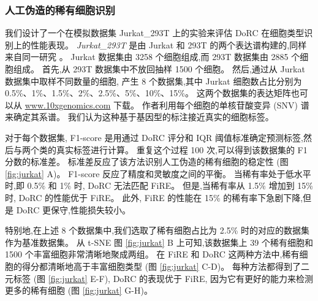 \subsubsection{人工伪造的稀有细胞识别}
\label{subsec:recplanted} 


我们设计了一个在模拟数据集 Jurkat\_293T 上的实验来评估 DoRC 在细胞类型识别上的性能表现。
 \textit{Jurkat\_293T} 是由 Jurkat 和 293T 的两个表达谱构建的,同样来自同一研究 。
Jurkat 数据集由 3258 个细胞组成,而 293T 数据集由 2885 个细胞组成。
首先,从 293T 数据集中不放回抽样 1500 个细胞。
然后,通过从 Jurkat 数据集中取样不同数量的细胞,
产生 8 个数据集,其中 Jurkat 细胞数占比分别为 0.5\%、1\%、1.5\%、2\%、2.5\%、5\%、10\%、15\%。
这两个数据集的表达矩阵也可以从 \url{www.10xgenomics.com} 下载。
作者利用每个细胞的单核苷酸变异 (SNV) 谱来确定其系谱。
我们认为这种基于基因型的标注接近真实的细胞标签。

对于每个数据集, F1-score 是用通过 DoRC 评分和 IQR 阈值标准确定预测标签,然后与两个类的真实标签进行计算。
重复这个过程 100 次,可以得到该数据集的 F1 分数的标准差。
标准差反应了该方法识别人工伪造的稀有细胞的稳定性 (图 \ref{fig:jurkat} A)。 
F1-score 反应了精度和灵敏度之间的平衡。
当稀有率处于低水平时,即 0.5\% 和 1\% 时, DoRC 无法匹配 FiRE。
但是,当稀有率从 1.5\% 增加到 15\% 时, DoRC 的性能优于 FiRE。
此外, FiRE 的性能在 15\% 的稀有率下急剧下降,但是 DoRC 更保守,性能损失较小。

特别地,在上述 8 个数据集中,我们选取了稀有细胞占比为 2.5\% 时的对应的数据集作为基准数据集。
从 t-SNE 图 \ref{fig:jurkat} B 上可知,该数据集上 39 个稀有细胞和 1500 个丰富细胞非常清晰地聚成两组。
在 FiRE 和 DoRC 这两种方法中,稀有细胞的得分都清晰地高于丰富细胞类型 (图 \ref{fig:jurkat} C-D)。
每种方法都得到了二元标签 (图 \ref{fig:jurkat} E-F), DoRC 的表现优于 FiRE,
因为它有更好的能力来检测更多的稀有细胞 (图 \ref{fig:jurkat} G-H)。

